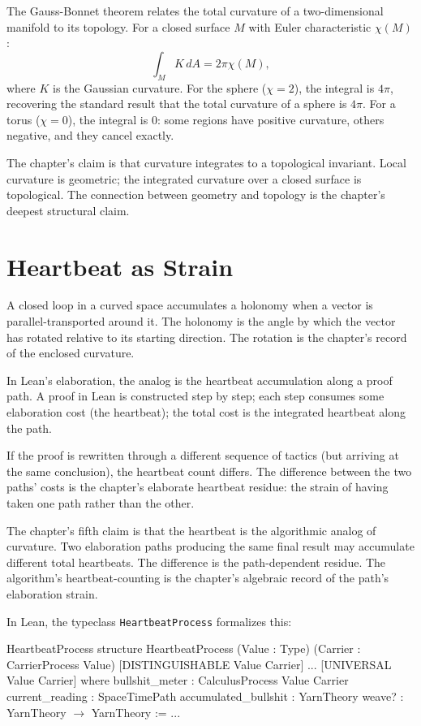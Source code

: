 The Gauss-Bonnet theorem relates the total curvature of a
two-dimensional manifold to its topology. For a closed surface
$M$ with Euler characteristic $\chi(M)$:
\[
\int_M K \, dA = 2\pi \chi(M),
\]
where $K$ is the Gaussian curvature. For the sphere
($\chi = 2$), the integral is $4\pi$, recovering the standard
result that the total curvature of a sphere is $4\pi$. For a
torus ($\chi = 0$), the integral is $0$: some regions have
positive curvature, others negative, and they cancel exactly.

The chapter's claim is that curvature integrates to a
topological invariant. Local curvature is geometric; the integrated
curvature over a closed surface is topological. The connection
between geometry and topology is the chapter's deepest
structural claim.

\section{Heartbeat as Strain}
\label{se:heartbeat-as-strain}

A closed loop in a curved space accumulates a holonomy when a vector
is parallel-transported around it. The holonomy is the angle by
which the vector has rotated relative to its starting direction.
The rotation is the chapter's record of the enclosed curvature.

In Lean's elaboration, the analog is the heartbeat accumulation
along a proof path. A proof in Lean is constructed step by step;
each step consumes some elaboration cost (the heartbeat); the
total cost is the integrated heartbeat along the path.

If the proof is rewritten through a different sequence of tactics
(but arriving at the same conclusion), the heartbeat count differs.
The difference between the two paths' costs is the chapter's
elaborate heartbeat residue: the strain of having taken one path
rather than the other.

The chapter's fifth claim is that the heartbeat is the
algorithmic analog of curvature. Two elaboration paths
producing the same final result may accumulate different total
heartbeats. The difference is the path-dependent residue. The
algorithm's heartbeat-counting is the chapter's algebraic
record of the path's elaboration strain.

In Lean, the typeclass \texttt{HeartbeatProcess} formalizes this:

\begin{leanexcerpt}{HeartbeatProcess}
structure HeartbeatProcess
    (Value : Type)
    (Carrier : CarrierProcess Value)
    [DISTINGUISHABLE Value Carrier] ... [UNIVERSAL Value Carrier]
  where
  bullshit_meter       : CalculusProcess Value Carrier
  current_reading      : SpaceTimePath
  accumulated_bullshit : YarnTheory
  weave? : YarnTheory $\to$ YarnTheory := ...
\end{leanexcerpt}

